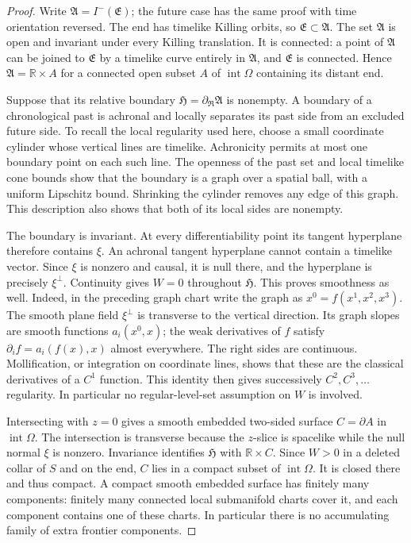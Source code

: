 \begin{proof}
Write $\mathfrak A=I^-(\mathfrak E)$; the future case has the same proof
with time orientation reversed.  The end has timelike Killing orbits,
so $\mathfrak E\subset\mathfrak A$.  The set $\mathfrak A$ is open and
invariant under every Killing translation.  It is connected: a point of
$\mathfrak A$ can be joined to $\mathfrak E$ by a timelike curve entirely
in $\mathfrak A$, and $\mathfrak E$ is connected.  Hence
$\mathfrak A=\mathbb R\times A$ for a connected open subset $A$ of
$\operatorname{int}\Omega$ containing its distant end.

Suppose that its relative boundary $\mathfrak H=\partial_{\mathfrak R}
\mathfrak A$ is nonempty.  A boundary of a chronological past is
achronal and locally separates its past side from an excluded future
side.  To recall the local regularity used here, choose a small coordinate
cylinder whose vertical lines are timelike.  Achronicity permits at most
one boundary point on each such line.  The openness of the past set and
local timelike cone bounds show that the boundary is a graph over a
spatial ball, with a uniform Lipschitz bound.  Shrinking the cylinder
removes any edge of this graph.  This description also shows that both
of its local sides are nonempty.

The boundary is invariant.  At every differentiability point its tangent
hyperplane therefore contains $\xi$.  An achronal tangent hyperplane
cannot contain a timelike vector.  Since $\xi$ is nonzero and causal,
it is null there, and the hyperplane is precisely $\xi^\perp$.
Continuity gives $W=0$ throughout $\mathfrak H$.  This proves smoothness
as well.  Indeed, in the preceding graph chart write the graph as
$x^0=f(x^1,x^2,x^3)$.  The smooth plane field $\xi^\perp$ is transverse
to the vertical direction.  Its graph slopes are smooth functions
$a_i(x^0,x)$; the weak derivatives of $f$ satisfy
$\partial_i f=a_i(f(x),x)$ almost everywhere.  The right sides are
continuous.  Mollification, or integration on coordinate lines, shows
that these are the classical derivatives of a $C^1$ function.  This
identity then gives successively $C^2,C^3,\ldots$ regularity.  In
particular no regular-level-set assumption on $W$ is involved.

Intersecting with $z=0$ gives a smooth embedded two-sided surface
$C=\partial A$ in $\operatorname{int}\Omega$.  The intersection is
transverse because the $z$-slice is spacelike while the null normal
$\xi$ is nonzero.  Invariance identifies $\mathfrak H$ with
$\mathbb R\times C$.  Since $W>0$ in a deleted collar of $S$ and on
the end, $C$ lies in a compact subset of $\operatorname{int}\Omega$.
It is closed there and thus compact.  A compact smooth embedded
surface has finitely many components: finitely many connected local
submanifold charts cover it, and each component contains one of these
charts.  In particular there is no accumulating family of extra
frontier components.


\end{proof}
